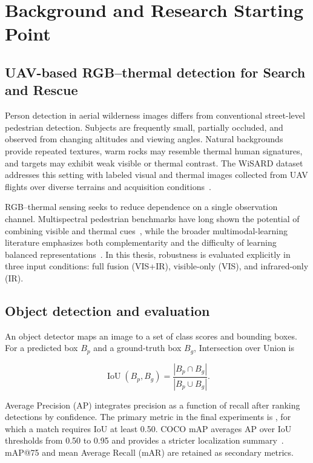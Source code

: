 \chapter{Background and Research Starting Point}
\label{chap:background}

\section{UAV-based RGB--thermal detection for Search and Rescue}

Person detection in aerial wilderness images differs from conventional
street-level pedestrian detection. Subjects are frequently small, partially
occluded, and observed from changing altitudes and viewing angles. Natural
backgrounds provide repeated textures, warm rocks may resemble thermal human
signatures, and targets may exhibit weak visible or thermal contrast. The
WiSARD dataset addresses this setting with labeled visual and thermal images
collected from UAV flights over diverse terrains and acquisition conditions~\cite{broyles2022wisard}.

RGB--thermal sensing seeks to reduce dependence on a single observation
channel. Multispectral pedestrian benchmarks have long shown the potential of
combining visible and thermal cues~\cite{hwang2015multispectral}, while the
broader multimodal-learning literature emphasizes both complementarity and the
difficulty of learning balanced representations~\cite{baltrusaitis2019multimodal,wang2020multimodal}.
In this thesis, robustness is evaluated explicitly in three input conditions:
full fusion (VIS+IR), visible-only (VIS), and infrared-only (IR).

\section{Object detection and evaluation}

An object detector maps an image to a set of class scores and bounding boxes.
For a predicted box \(B_p\) and a ground-truth box \(B_g\), Intersection over
Union is

\begin{equation}
  \operatorname{IoU}(B_p,B_g)=
  \frac{|B_p\cap B_g|}{|B_p\cup B_g|}.
\end{equation}

Average Precision (AP) integrates precision as a function of recall after
ranking detections by confidence. The primary metric in the final experiments
is \mapfifty{}, for which a match requires IoU at least 0.50. COCO mAP averages
AP over IoU thresholds from 0.50 to 0.95 and provides a stricter localization
summary~\cite{lin2014coco}. mAP@75 and mean Average Recall (mAR) are retained as
secondary metrics.

